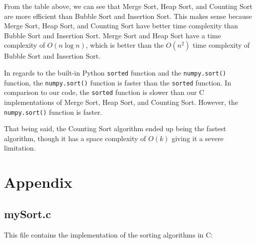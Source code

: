 \documentclass[12pt]{article}
\begin{document}
From the table above, we can see that Merge Sort, Heap Sort, and Counting Sort are more efficient than Bubble Sort and Insertion Sort.
This makes sense because Merge Sort, Heap Sort, and Counting Sort have better time complexity than Bubble Sort and Insertion Sort.
Merge Sort and Heap Sort have a time complexity of $O(n\log n)$, which is better than the $O(n^2)$ time complexity of Bubble Sort and Insertion Sort.

In regards to the built-in Python \texttt{sorted} function and the \texttt{numpy.sort()} function, the \texttt{numpy.sort()} function is faster than the \texttt{sorted} function.
In comparison to our code, the \texttt{sorted} function is slower than our C implementations of Merge Sort, Heap Sort, and Counting Sort.
However, the \texttt{numpy.sort()} function is faster.

That being said, the Counting Sort algorithm ended up being the fastest algorithm, though it has a space complexity of $O(k)$ giving it a severe limitation.

\section{Appendix}

\subsection{mySort.c}

This file contains the implementation of the sorting algorithms in C:
\end{document}

